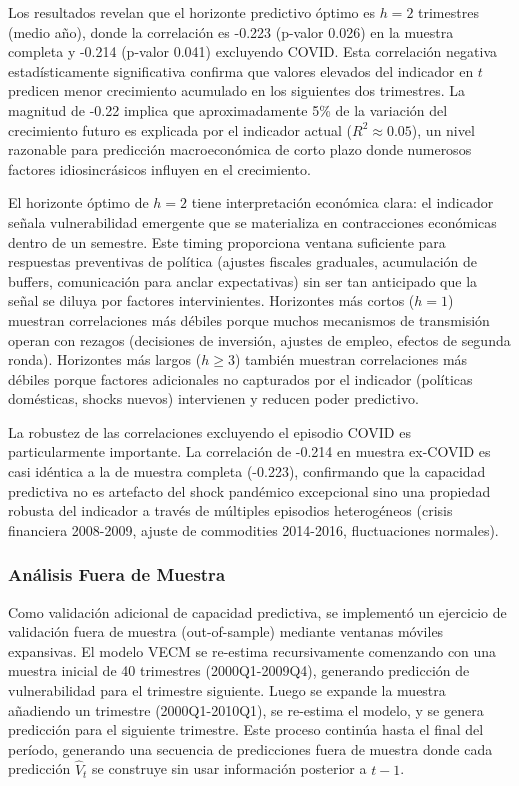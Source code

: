 \documentclass[3p,11pt,draft,natbib=false]{elsarticle}
\begin{document}
Los resultados revelan que el horizonte predictivo óptimo es $h=2$ trimestres (medio año), donde la correlación es -0.223 (p-valor 0.026) en la muestra completa y -0.214 (p-valor 0.041) excluyendo COVID. Esta correlación negativa estadísticamente significativa confirma que valores elevados del indicador en $t$ predicen menor crecimiento acumulado en los siguientes dos trimestres. La magnitud de -0.22 implica que aproximadamente 5\% de la variación del crecimiento futuro es explicada por el indicador actual ($R^2 \approx 0.05$), un nivel razonable para predicción macroeconómica de corto plazo donde numerosos factores idiosincrásicos influyen en el crecimiento.

El horizonte óptimo de $h=2$ tiene interpretación económica clara: el indicador señala vulnerabilidad emergente que se materializa en contracciones económicas dentro de un semestre. Este timing proporciona ventana suficiente para respuestas preventivas de política (ajustes fiscales graduales, acumulación de buffers, comunicación para anclar expectativas) sin ser tan anticipado que la señal se diluya por factores intervinientes. Horizontes más cortos ($h=1$) muestran correlaciones más débiles porque muchos mecanismos de transmisión operan con rezagos (decisiones de inversión, ajustes de empleo, efectos de segunda ronda). Horizontes más largos ($h \geq 3$) también muestran correlaciones más débiles porque factores adicionales no capturados por el indicador (políticas domésticas, shocks nuevos) intervienen y reducen poder predictivo.

La robustez de las correlaciones excluyendo el episodio COVID es particularmente importante. La correlación de -0.214 en muestra ex-COVID es casi idéntica a la de muestra completa (-0.223), confirmando que la capacidad predictiva no es artefacto del shock pandémico excepcional sino una propiedad robusta del indicador a través de múltiples episodios heterogéneos (crisis financiera 2008-2009, ajuste de commodities 2014-2016, fluctuaciones normales).

\subsubsection{Análisis Fuera de Muestra}

Como validación adicional de capacidad predictiva, se implementó un ejercicio de validación fuera de muestra (out-of-sample) mediante ventanas móviles expansivas. El modelo VECM se re-estima recursivamente comenzando con una muestra inicial de 40 trimestres (2000Q1-2009Q4), generando predicción de vulnerabilidad para el trimestre siguiente. Luego se expande la muestra añadiendo un trimestre (2000Q1-2010Q1), se re-estima el modelo, y se genera predicción para el siguiente trimestre. Este proceso continúa hasta el final del período, generando una secuencia de predicciones fuera de muestra donde cada predicción $\hat{V}_t$ se construye sin usar información posterior a $t-1$.
\end{document}

